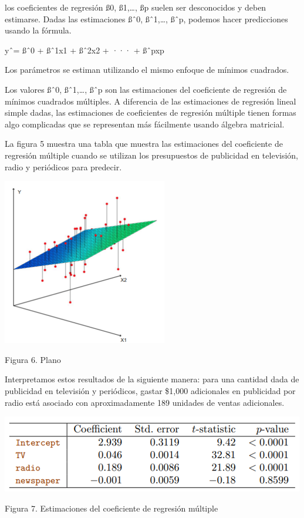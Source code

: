 \documentclass[
  letterpaper,
  DIV=11,
  numbers=noendperiod]{scrartcl}
\begin{document}
los coeficientes de regresión ß0, ß1,\ldots, ßp suelen ser desconocidos
y deben estimarse. Dadas las estimaciones ßˆ0, ßˆ1,\ldots, ßˆp, podemos
hacer predicciones usando la fórmula.

yˆ= ßˆ0 + ßˆ1x1 + ßˆ2x2 + ··· + ßˆpxp

Los parámetros se estiman utilizando el mismo enfoque de mínimos
cuadrados.

Los valores ßˆ0, ßˆ1,\ldots, ßˆp son las estimaciones del coeficiente de
regresión de mínimos cuadrados múltiples. A diferencia de las
estimaciones de regresión lineal simple dadas, las estimaciones de
coeficientes de regresión múltiple tienen formas algo complicadas que se
representan más fácilmente usando álgebra matricial.

La figura 5 muestra una tabla que muestra las estimaciones del
coeficiente de regresión múltiple cuando se utilizan los presupuestos de
publicidad en televisión, radio y periódicos para predecir.

\begin{Figura 6. Plano}

{\centering \includegraphics{cap15.png}

}

\caption{Figura 6. Plano}

\end{Figura 6. Plano}

Interpretamos estos resultados de la siguiente manera: para una cantidad
dada de publicidad en televisión y periódicos, gastar \$1,000
adicionales en publicidad por radio está asociado con aproximadamente
189 unidades de ventas adicionales.

\begin{Figura 7. Estimaciones del coeficiente de regresión múltiple}

{\centering \includegraphics{cap16.png}

}

\caption{Figura 7. Estimaciones del coeficiente de regresión múltiple}

\end{Figura 7. Estimaciones del coeficiente de regresión múltiple}
\end{document}
